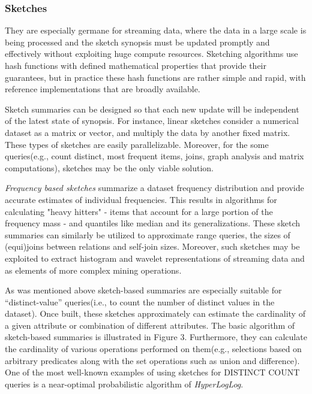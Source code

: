 \documentclass[10pt, conference, compsocconf]{IEEEtran}
\begin{document}
\subsubsection{\textbf{Sketches}}

They are especially germane for streaming data, where the data in a large scale is being processed and the sketch synopsis must be updated promptly and effectively without exploiting huge compute resources. Sketching algorithms use hash functions with defined mathematical properties that provide their guarantees, but in practice these hash functions are rather simple and rapid, with reference implementations that are broadly available.  

Sketch summaries can be designed so that each new update will be independent of the latest state of synopsis. For instance, linear sketches consider a numerical dataset as a matrix or vector, and multiply the data by another fixed matrix. These types of sketches are easily parallelizable. Moreover, for the some queries(e.g., count distinct, most frequent items, joins, graph analysis and matrix computations), sketches may be the only viable solution.

\textit{Frequency based sketches} summarize a dataset frequency distribution and provide accurate estimates of individual frequencies. This results in algorithms for calculating "heavy hitters" - items that account for a large portion of the frequency mass - and quantiles like median and its generalizations. These sketch summaries can similarly be utilized to approximate range queries, the sizes of (equi)joins between relations and self-join sizes. Moreover, such sketches may be exploited to extract histogram and wavelet representations of streaming data and as elements of more complex mining operations.

As was mentioned above sketch-based summaries are especially suitable for “distinct-value” queries(i.e., to count the number of distinct values in the dataset). Once built, these sketches approximately can estimate the cardinality of a given attribute or combination of different attributes. The basic algorithm of sketch-based summaries is illustrated in Figure 3. Furthermore, they can calculate the cardinality of various operations performed on them(e.g., selections based on arbitrary predicates along with the set operations such as union and difference). One of the most well-known examples of using sketches for DISTINCT COUNT queries is a near-optimal probabilistic algorithm of \textit{HyperLogLog}. 
\end{document}
